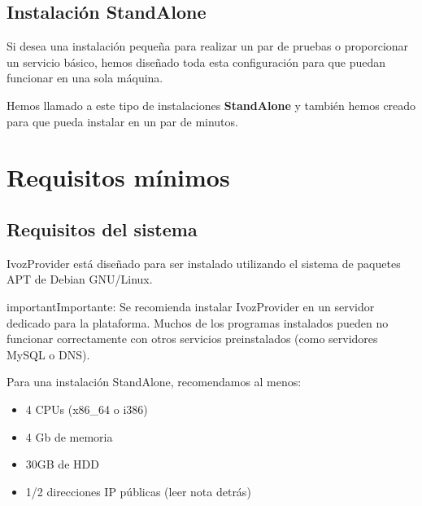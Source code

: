 \documentclass[letterpaper,10pt,spanish]{sphinxmanual}
\begin{document}
\subsection{Instalación StandAlone}
\label{basic_concepts/installation/install_types:instalacion-standalone}\label{basic_concepts/installation/install_types:id2}\label{basic_concepts/installation/install_types:standalone-install}
Si desea una instalación pequeña para realizar un par de pruebas o proporcionar un servicio básico, hemos diseñado toda esta configuración para que puedan funcionar en una sola máquina.

Hemos llamado a este tipo de instalaciones \textbf{StandAlone} y también hemos creado {\hyperref[basic_concepts/installation/cd_install:automatic\string-iso\string-cd\string-image]{}} para que pueda instalar en un par de minutos.
\label{basic_concepts/installation/requirements:minimum-requirements}

\section{Requisitos mínimos}
\label{basic_concepts/installation/requirements:requisitos-minimos}\label{basic_concepts/installation/requirements:id1}\label{basic_concepts/installation/requirements::doc}\label{basic_concepts/installation/requirements:minimum-requirements}

\subsection{Requisitos del sistema}
\label{basic_concepts/installation/requirements:system-requirements}
IvozProvider está diseñado para ser instalado utilizando el sistema de paquetes APT de Debian GNU/Linux.

\begin{notice}{important}{Importante:}
Se recomienda instalar IvozProvider en un servidor dedicado para la plataforma. Muchos de los programas instalados pueden no funcionar correctamente con otros servicios preinstalados (como servidores MySQL o DNS).
\end{notice}

Para una instalación StandAlone, recomendamos al menos:
\begin{itemize}
\item {} 
4 CPUs (x86\_64 o i386)

\item {} 
4 Gb de memoria

\item {} 
30GB de HDD

\item {} 
1/2 direcciones IP públicas (leer nota detrás)

\end{itemize}
\end{document}
